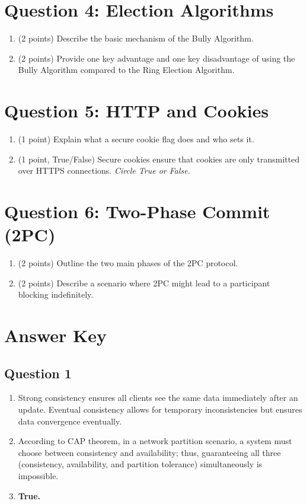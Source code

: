 \documentclass[12pt]{article}
\begin{document}
\section*{Question 4: Election Algorithms}
\begin{enumerate}[label=(\alph*)]
    \item (2 points) Describe the basic mechanism of the Bully Algorithm.
    \item (2 points) Provide one key advantage and one key disadvantage of using the Bully Algorithm compared to the Ring Election Algorithm.
\end{enumerate}

\section*{Question 5: HTTP and Cookies}
\begin{enumerate}[label=(\alph*)]
    \item (1 point) Explain what a secure cookie flag does and who sets it.
    \item (1 point, True/False) Secure cookies ensure that cookies are only transmitted over HTTPS connections. \textit{Circle True or False.}
\end{enumerate}

\section*{Question 6: Two-Phase Commit (2PC)}
\begin{enumerate}[label=(\alph*)]
    \item (2 points) Outline the two main phases of the 2PC protocol.
    \item (2 points) Describe a scenario where 2PC might lead to a participant blocking indefinitely.
\end{enumerate}

\newpage
\section*{Answer Key}

\subsection*{Question 1}
\begin{enumerate}[label=(\alph*)]
    \item Strong consistency ensures all clients see the same data immediately after an update. Eventual consistency allows for temporary inconsistencies but ensures data convergence eventually.
    \item According to CAP theorem, in a network partition scenario, a system must choose between consistency and availability; thus, guaranteeing all three (consistency, availability, and partition tolerance) simultaneously is impossible.
    \item \textbf{True.}
\end{enumerate}
\end{document}
